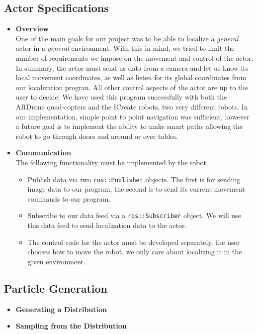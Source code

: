 \documentclass[a4paper,11pt]{article}
\begin{document}
 \subsection{Actor Specifications}
\begin{itemize}
\item \textbf{Overview} \\
One of the main goals for our project was to be able to localize a \emph{general} actor in a \emph{general} environment. With this in mind, we tried to limit the number of requirements we impose on the movement and control of the actor. In summary, the actor must send us data from a camera and let us know its local movement coordinates, as well as listen for its global coordinates from our localization progran. All other control aspects of the actor are up to the user to decide. We have used this program successfully with both the ARDrone quad-copters and the ICreate robots, two very different robots. In our implementation, simple point to point navigation was sufficient, however a future goal is to implement the ability to make smart paths allowing the robot to go through doors and around or over tables.

\item \textbf{Communication} \\
The following functionality must be implemented by the robot
  \begin{itemize}
  \item Publish data via two \texttt{ros::Publisher} objects. The first is for sending image data to our program, the second is to send its current movement commands to our program. 
  \item Subscribe to our data feed via a \texttt{ros::Subscriber} object. We will use this data feed to send localization data to the actor.
  \item The control code for the actor must be developed separately, the user chooses how to move the robot, we only care about localizing it in the given environment.
  \end{itemize} 
\end{itemize}

\subsection{Particle Generation}
\begin{itemize}
  \item \textbf{Generating a Distribution}
  \item \textbf{Sampling from the Distribution}
\end{itemize}
\end{document}
